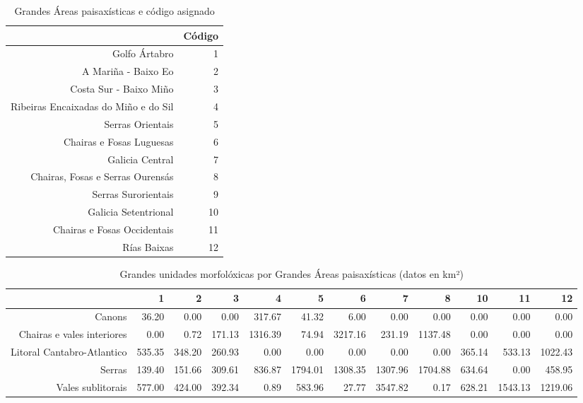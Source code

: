 \begin{table}[p]
\centering
\caption{Grandes Áreas paisaxísticas e código asignado} 
\label{xtaboa0}
\begin{tabular}{rr}
  \hline
 & Código \\ 
  \hline
Golfo Ártabro &   1 \\ 
  A Mariña - Baixo Eo &   2 \\ 
  Costa Sur - Baixo Miño &   3 \\ 
  Ribeiras Encaixadas do Miño e do Sil &   4 \\ 
  Serras Orientais &   5 \\ 
  Chairas e Fosas Luguesas &   6 \\ 
  Galicia Central &   7 \\ 
  Chairas, Fosas e Serras Ourensás &   8 \\ 
  Serras Surorientais &   9 \\ 
  Galicia Setentrional &  10 \\ 
  Chairas e Fosas Occidentais &  11 \\ 
  Rías Baixas &  12 \\ 
   \hline
\end{tabular}
\end{table}
\begin{table}[p]
\centering
\caption{Grandes unidades morfolóxicas por Grandes Áreas paisaxísticas (datos en km²)} 
\label{xtaboa1}
\begin{tabular}{rrrrrrrrrrrr}
  \hline
 & 1 & 2 & 3 & 4 & 5 & 6 & 7 & 8 & 10 & 11 & 12 \\ 
  \hline
Canons & 36.20 & 0.00 & 0.00 & 317.67 & 41.32 & 6.00 & 0.00 & 0.00 & 0.00 & 0.00 & 0.00 \\ 
  Chairas e vales interiores & 0.00 & 0.72 & 171.13 & 1316.39 & 74.94 & 3217.16 & 231.19 & 1137.48 & 0.00 & 0.00 & 0.00 \\ 
  Litoral Cantabro-Atlantico & 535.35 & 348.20 & 260.93 & 0.00 & 0.00 & 0.00 & 0.00 & 0.00 & 365.14 & 533.13 & 1022.43 \\ 
  Serras & 139.40 & 151.66 & 309.61 & 836.87 & 1794.01 & 1308.35 & 1307.96 & 1704.88 & 634.64 & 0.00 & 458.95 \\ 
  Vales sublitorais & 577.00 & 424.00 & 392.34 & 0.89 & 583.96 & 27.77 & 3547.82 & 0.17 & 628.21 & 1543.13 & 1219.06 \\ 
   \hline
\end{tabular}
\end{table}
